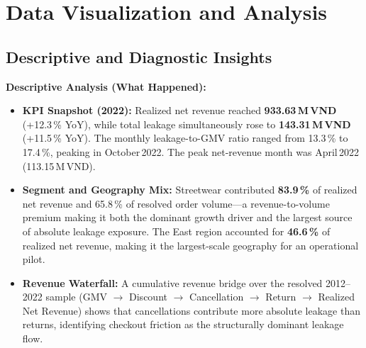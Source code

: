 \documentclass[10pt]{article}
\begin{document}
\section{Data Visualization and Analysis}
\label{sec:eda}

\subsection{Descriptive and Diagnostic Insights}

\textbf{Descriptive Analysis (What Happened):}
\begin{itemize}
    \item \textbf{KPI Snapshot (2022):} Realized net revenue reached \textbf{933.63\,M\,VND} (+12.3\,\% YoY), while total leakage simultaneously rose to \textbf{143.31\,M\,VND} (+11.5\,\% YoY). The monthly leakage-to-GMV ratio ranged from 13.3\,\% to 17.4\,\%, peaking in October\,2022. The peak net-revenue month was April\,2022 (113.15\,M\,VND).
    \item \textbf{Segment and Geography Mix:} Streetwear contributed \textbf{83.9\,\%} of realized net revenue and 65.8\,\% of resolved order volume---a revenue-to-volume premium making it both the dominant growth driver and the largest source of absolute leakage exposure. The East region accounted for \textbf{46.6\,\%} of realized net revenue, making it the largest-scale geography for an operational pilot.
    \item \textbf{Revenue Waterfall:} A cumulative revenue bridge over the resolved 2012--2022 sample (GMV $\to$ Discount $\to$ Cancellation $\to$ Return $\to$ Realized Net Revenue) shows that cancellations contribute more absolute leakage than returns, identifying checkout friction as the structurally dominant leakage flow.
\end{itemize}
\end{document}

